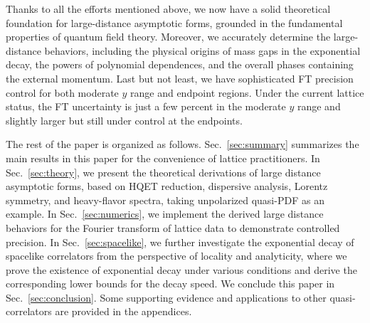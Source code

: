 \documentclass[a4paper,11pt]{article}
\begin{document}
Thanks to all the efforts mentioned above, we now have a solid theoretical foundation for large-distance asymptotic forms, grounded in the fundamental properties of quantum field theory. Moreover, we accurately determine the large-distance behaviors, including the physical origins of mass gaps in the exponential decay, the powers of polynomial dependences, and the overall phases containing the external momentum. Last but not least, we have sophisticated FT precision control for both moderate $y$ range and endpoint regions. Under the current lattice status, the FT uncertainty is just a few percent in the moderate $y$ range and slightly larger but still under control at the endpoints. 

The rest of the paper is organized as follows. Sec.~\ref{sec:summary} summarizes the main results in this paper for the convenience of lattice practitioners. In Sec.~\ref{sec:theory}, we present the theoretical derivations of large distance asymptotic forms, based on HQET reduction, dispersive analysis, Lorentz symmetry, and heavy-flavor spectra, taking unpolarized quasi-PDF as an example. In Sec.~\ref {sec:numerics}, we implement the derived large distance behaviors for the Fourier transform of lattice data to demonstrate controlled precision. In Sec.~\ref{sec:spacelike}, we further investigate the exponential decay of spacelike correlators from the perspective of locality and analyticity, where we prove the existence of exponential decay under various conditions and derive the corresponding lower bounds for the decay speed. We conclude this paper in Sec.~\ref{sec:conclusion}. Some supporting evidence and applications to other quasi-correlators are provided in the appendices. 
\end{document}
